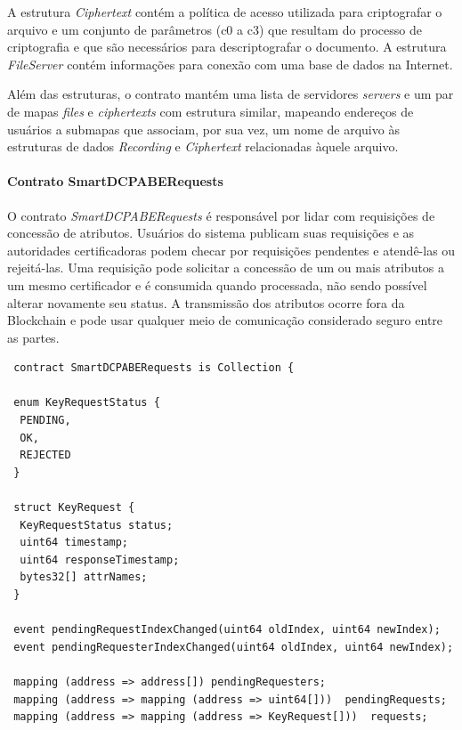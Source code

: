 \documentclass[a4paper,11pt]{article}
\begin{document}
A estrutura \emph{Ciphertext} contém a política de acesso utilizada para criptografar o arquivo e um conjunto de parâmetros (c0 a c3) que resultam do processo de criptografia e que são necessários para descriptografar o documento.
A estrutura \emph{FileServer} contém informações para conexão com uma base de dados na Internet.

Além das estruturas, o contrato mantém uma lista de servidores \emph{servers} e um par de mapas \emph{files} e \emph{ciphertexts} com estrutura similar, mapeando endereços de usuários a submapas que associam, por sua vez, um nome de arquivo às estruturas de dados \emph{Recording} e \emph{Ciphertext} relacionadas àquele arquivo. %

\paragraph{Contrato SmartDCPABERequests}



O contrato \emph{SmartDCPABERequests}  é responsável por lidar com requisições de concessão de atributos.
Usuários do sistema publicam suas requisições e as autoridades certificadoras podem checar por requisições pendentes e atendê-las ou rejeitá-las.
Uma requisição pode solicitar a concessão de um ou mais atributos a um mesmo certificador e é consumida quando processada, não sendo possível alterar novamente seu status.
A transmissão dos atributos ocorre fora da Blockchain e pode usar qualquer meio de comunicação considerado seguro entre as partes.


\begin{lstlisting}
 contract SmartDCPABERequests is Collection {

 enum KeyRequestStatus {
  PENDING,
  OK,
  REJECTED
 }

 struct KeyRequest {
  KeyRequestStatus status;
  uint64 timestamp;
  uint64 responseTimestamp;
  bytes32[] attrNames;
 }

 event pendingRequestIndexChanged(uint64 oldIndex, uint64 newIndex);
 event pendingRequesterIndexChanged(uint64 oldIndex, uint64 newIndex);

 mapping (address => address[]) pendingRequesters;
 mapping (address => mapping (address => uint64[]))  pendingRequests;
 mapping (address => mapping (address => KeyRequest[]))  requests;
\end{lstlisting}
\end{document}
